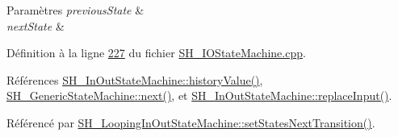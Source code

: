 \begin{DoxyParams}{Paramètres}
{\em previous\-State} & \\
\hline
{\em next\-State} & \\
\hline
\end{DoxyParams}


Définition à la ligne \hyperlink{SH__IOStateMachine_8cpp_source_l00227}{227} du fichier \hyperlink{SH__IOStateMachine_8cpp_source}{S\-H\-\_\-\-I\-O\-State\-Machine.\-cpp}.



Références \hyperlink{classSH__InOutStateMachine_af71bfdb3b59b7bf2763588b513b4205f}{S\-H\-\_\-\-In\-Out\-State\-Machine\-::history\-Value()}, \hyperlink{classSH__GenericStateMachine_af4771d31d87951c997fba1633c2d67f6}{S\-H\-\_\-\-Generic\-State\-Machine\-::next()}, et \hyperlink{classSH__InOutStateMachine_a9fa5db44086de2576c812f631aa4f60a}{S\-H\-\_\-\-In\-Out\-State\-Machine\-::replace\-Input()}.



Référencé par \hyperlink{classSH__LoopingInOutStateMachine_a0ee122553641721012f3710e71cce234}{S\-H\-\_\-\-Looping\-In\-Out\-State\-Machine\-::set\-States\-Next\-Transition()}.


